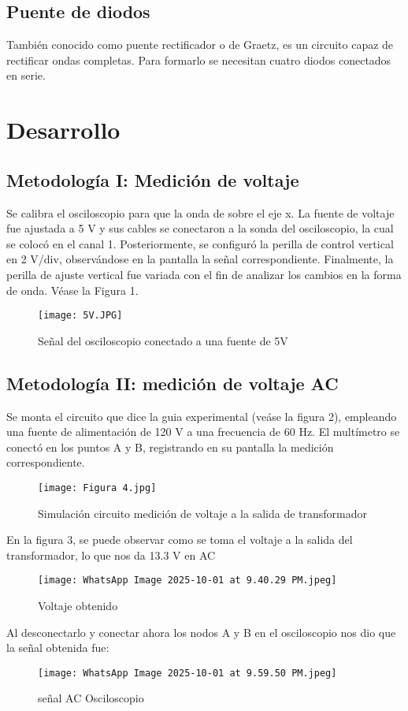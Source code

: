 \documentclass[conference]{IEEEtran} %
\begin{document}
\subsection{Puente de diodos}
También conocido como puente rectificador o de Graetz, es un circuito capaz de rectificar ondas completas. Para formarlo se necesitan cuatro diodos conectados en serie.~\cite{puenteDiodos}


\section{Desarrollo}
\subsection{Metodología I: Medición de voltaje}
Se calibra el osciloscopio para que la onda de sobre el eje x.
La fuente de voltaje fue ajustada a 5 V y sus cables se conectaron a la sonda del osciloscopio, la cual se colocó en el canal 1. Posteriormente, se configuró la perilla de control vertical en 2 V/div, observándose en la pantalla la señal correspondiente. Finalmente, la perilla de ajuste vertical fue variada con el fin de analizar los cambios en la forma de onda. Véase la Figura 1.
\begin{figure}[H]
    \centering
    \texttt{[image: 5V.JPG]}
    \caption{Señal del osciloscopio conectado a una fuente de 5V}
    \label{fig:placeholder}
\end{figure}

\subsection{Metodología II: medición de voltaje AC}
Se monta el circuito que dice la guia experimental (veáse la figura 2), empleando una fuente de alimentación de 120 V a una frecuencia de 60 Hz. El multímetro se conectó en los puntos A y B, registrando en su pantalla la medición correspondiente.

\begin{figure}[H]
    \centering
    \texttt{[image: Figura 4.jpg]}
    \caption{Simulación circuito medición de voltaje a la salida de transformador}
    \label{fig:placeholder}
\end{figure}
En la figura 3, se puede observar como se toma el voltaje a la salida del transformador, lo que nos da 13.3 V en AC 
\begin{figure}[H]
    \centering
    \texttt{[image: WhatsApp Image 2025-10-01 at 9.40.29 PM.jpeg]}
    \caption{Voltaje obtenido}
    \label{fig:placeholder}
\end{figure}
Al desconectarlo y conectar ahora los nodos A y B en el osciloscopio nos dio que la señal obtenida fue: 
\begin{figure}[H]
    \centering
    \texttt{[image: WhatsApp Image 2025-10-01 at 9.59.50 PM.jpeg]}
    \caption{señal AC Osciloscopio}
    \label{fig:placeholder}
\end{figure}
\end{document}
